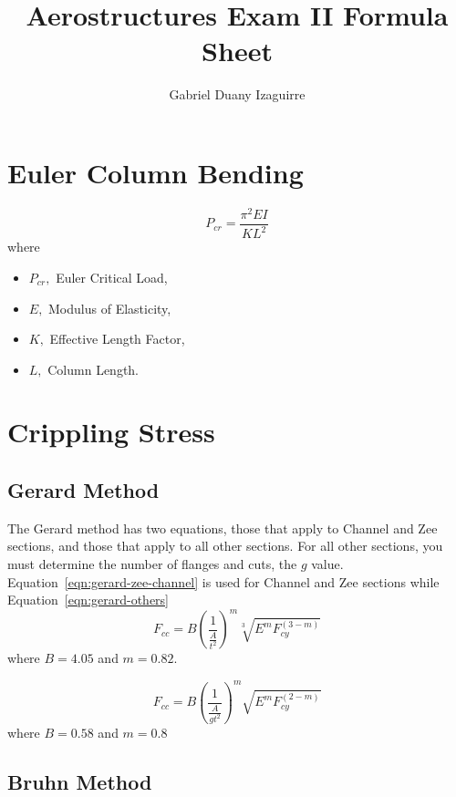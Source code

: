 \documentclass{article}
\title{Aerostructures Exam II Formula Sheet}
\author{Gabriel Duany Izaguirre}
\date{}
\begin{document}
\maketitle
\section{Euler Column Bending}
\begin{equation}
P_{cr} = \frac{\pi ^ 2 EI}{KL^2}
\end{equation}
where
\begin{itemize}
    \item $P_{cr},$ Euler Critical Load,
    \item $E,$ Modulus of Elasticity,
    \item $K,$ Effective Length Factor,
    \item $L,$ Column Length.
\end{itemize}
\section{Crippling Stress}
\subsection{Gerard Method}
The Gerard method has two equations, those that apply to Channel and Zee sections, and those that apply to all other sections.
For all other sections, you must determine the number of flanges and cuts, the $g$ value.
Equation~\ref{eqn:gerard-zee-channel} is used for Channel and Zee sections while Equation~\ref{eqn:gerard-others}
\begin{equation}\label{eqn:gerard-zee-channel}
    F_{cc} = B\left(\frac{1}{\frac{A}{t^2}}\right)^m\sqrt[3]{E^mF_{cy}^{(3-m)}}
\end{equation}
where $B = 4.05$ and $m=0.82$.

\begin{equation}\label{eqn:gerard-others}
   F_{cc} = B\left(\frac{1}{\frac{A}{gt^2}}\right)^m\sqrt{E^mF_{cy}^{(2-m)}}
\end{equation}
where $B = 0.58$ and $ m = 0.8$

\subsection{Bruhn Method}
\end{document}
